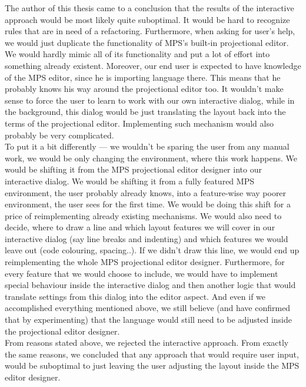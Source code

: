The author of this thesis came to a conclusion that the results of the interactive approach would be most likely quite suboptimal.
It would be hard to recognize rules that are in need of a refactoring.
Furthermore, when asking for user's help, we would just duplicate the functionality of MPS's built-in projectional editor.
We would hardly mimic all of its functionality and put a lot of effort into something already existent.
Moreover, our end user is expected to have knowledge of the MPS editor, since he is importing language there.
This means that he probably knows his way around the projectional editor too.
It wouldn't make sense to force the user to learn to work with our own interactive dialog, while in the background, this dialog would be just translating the layout back into the terms of the projectional editor.
Implementing such mechanism would also probably be very complicated.
\\

To put it a bit differently --- we wouldn't be sparing the user from any manual work, we would be only changing the environment, where this work happens.
We would be shifting it from the MPS projectional editor designer into our interactive dialog.
We would be shifting it from a fully featured MPS environment, the user probably already knows, into a feature-wise way poorer environment, the user sees for the first time.
We would be doing this shift for a price of reimplementing already existing mechanisms.
We would also need to decide, where to draw a line and which layout features we will cover in our interactive dialog (say line breaks and indenting) and which features we would leave out (code colouring, spacing..).
If we didn't draw this line, we would end up reimplementing the whole MPS projectional editor designer.
Furthermore, for every feature that we would choose to include, we would have to implement special behaviour inside the interactive dialog and then another logic that would translate settings from this dialog into the editor aspect.
And even if we accomplished everything mentioned above, we still believe (and have confirmed that by experimenting) that the language would still need to be adjusted inside the projectional editor designer.
\\

From reasons stated above, we rejected the interactive approach.
From exactly the same reasons, we concluded that any approach that would require user input, would be suboptimal to just leaving the user adjusting the layout inside the MPS editor designer.

